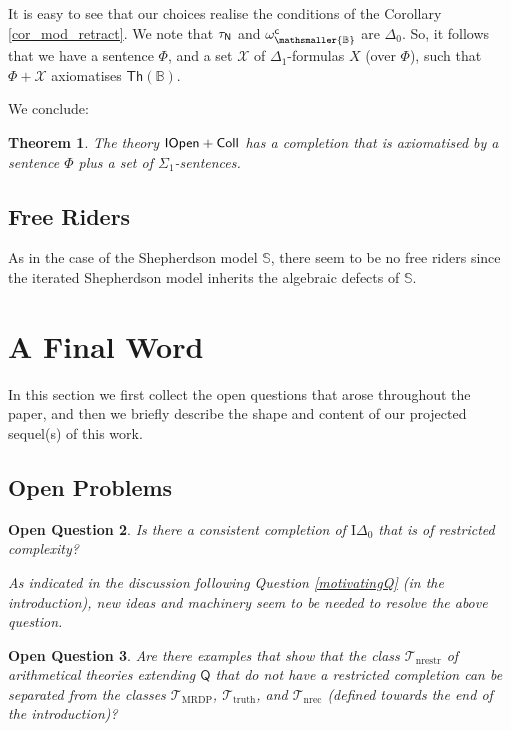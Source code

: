 \documentclass{amsart}
\newcommand{\qee} {\hspace*{2mm}\hfill \ding{109}}
\renewcommand{\Phi}{\varPhi}
\newtheorem{theorem}{Theorem}[section]
\newtheorem{ques}[theorem]{Open Question}
\newenvironment{question}{\begin{ques} \rm}{\qee\end{ques}}
\newcommand{\mc}[1]{\mathcal #1}
\newcommand{\mbbs}[1]{\ensuremath{\mathsmaller{\mathbb{#1}}}}
\begin{document}
It is easy to see that our choices realise the conditions of the Corollary \ref{cor_mod_retract}.
We note that $\tau_{\sf N}$ and $\omega_{\mbbs B}^{\sf c}$ are $\Delta_0$.
So, it follows that we have a sentence $\Phi$, and a set $\mc X$
of $\Delta_1$-formulas $X$  (over $\Phi$), such 
that $\Phi + \mc X$ axiomatises  $\mathsf{Th}(\mathbb{B})$.

We conclude:

\begin{theorem}\label{iopencollsmurf}
    The theory ${\sf IOpen}+{\sf Coll}$ has a completion that is axiomatised by a sentence $\Phi$ plus a set of $\Sigma_1$-sentences. 
\end{theorem}

\subsection{Free Riders}
As in the case of the Shepherdson model $\mathbb{S}$, there seem to be no free riders since the iterated Shepherdson model inherits the algebraic defects of $\mathbb{S}$.

\section{A Final Word} 
In this section we first collect the open questions that arose throughout the paper, and then we briefly describe the shape and content of our projected sequel(s) of this work.


\subsection{Open Problems}
\begin{question} \label{Q_about_IDelta_0}
Is there a consistent completion of $\mathrm{I}\Delta _{0}$ that is of restricted complexity?

As indicated in the discussion following Question \ref{motivatingQ} (in the introduction), new ideas and machinery seem to be needed to resolve the above question.
\end{question}
\begin{question}\label{Q_separation} Are there examples that show that the class $\mathcal{T}_{\mathrm{nrestr}}$ of arithmetical theories extending $\mathsf{Q}$ that 
do not have a restricted completion can be separated from the classes $\mathcal{T}_{\mathrm{MRDP}}$,    $\mathcal{T}_{\mathrm{truth}}$, and  
$\mathcal{T}_{\mathrm{nrec}}$ (defined towards the end of the introduction)?
\end{question}
\end{document}
